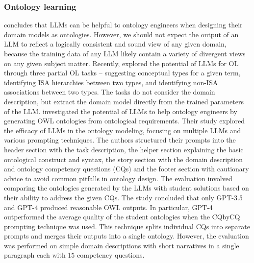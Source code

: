 \subsubsection{Ontology learning}

\citet{Neuhaus2023} concludes that LLMs can be helpful to ontology engineers when designing their domain models as ontologies. However, we should not expect the output of an LLM to reflect a logically consistent and sound view of any given domain, because the training data of any LLM likely contain a variety of divergent views on any given subject matter.
Recently, \citet{BabaeiGiglou2023} explored the potential of LLMs for OL through three partial OL tasks -- suggesting conceptual types for a given term, identifying ISA hierarchies between two types, and identifying non-ISA associations between two types. The tasks do not consider the domain description, but extract the domain model directly from the trained parameters of the LLM.
\citet{Saeedizade2024} investigated the potential of LLMs to help ontology engineers by generating OWL ontologies from ontological requirements.
Their study explored the efficacy of LLMs in the ontology modeling, focusing on multiple LLMs and various prompting techniques.
The authors structured their prompts into the header section with the task description, the helper section explaining the basic ontological construct and syntax, the story section with the domain description and ontology competency questions (CQs) and the footer section with cautionary advice to avoid common pitfalls in ontology design.
The evaluation involved comparing the ontologies generated by the LLMs with student solutions based on their ability to address the given CQs.
The study concluded that only GPT-3.5 and GPT-4 produced reasonable OWL outputs.
In particular, GPT-4 outperformed the average quality of the student ontologies when the CQbyCQ prompting technique was used.
This technique splits individual CQs into separate prompts and merges their outputs into a single ontology.
However, the evaluation was performed on simple domain descriptions with short narratives in a single paragraph each with 15 competency questions.
